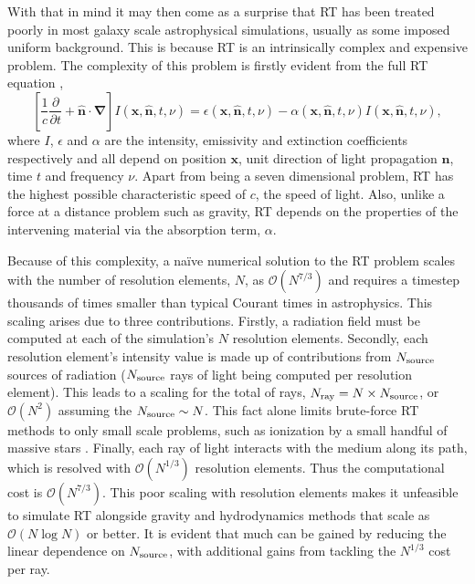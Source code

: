 \documentclass[fleq,usenatbib]{mnras}
\newcommand{\bigO}[1]{\mathcal{O}\left(#1\right)}
\newcommand{\NS}{N_{\rm source}}
\newcommand{\NR}{N_{\rm ray}}
\begin{document}
With that in mind it may then come as a surprise that RT has been treated 
poorly in most galaxy scale astrophysical simulations, usually as some 
imposed uniform background. This is because RT is an intrinsically complex and 
expensive problem. The complexity of this problem is firstly evident from the 
full RT equation 
\citep[e.g.][]{mihalasMihalas84},
\begin{equation} \label{eqn:classicrt}
\left[ \frac{1}{c} \frac{\partial}{\partial t} + \mathbf{\hat{n} \cdot \nabla}
 \right] I\left(\mathbf{x}, \mathbf{\hat{n}}, t, \nu\right) = 
\epsilon\left(\mathbf{x}, \mathbf{\hat{n}}, t, \nu\right) - 
\alpha\left(\mathbf{x}, \mathbf{\hat{n}}, t, \nu\right) 
I\left(\mathbf{x}, \mathbf{\hat{n}}, t, \nu\right),
\end{equation} 
where $I$, $\epsilon$ and $\alpha$ are the intensity, emissivity and 
extinction coefficients respectively and all depend on position $\mathbf{x}$, 
unit direction of light propagation $\mathbf{\hat{n}}$, time $t$ and frequency 
$\nu$. Apart from being a seven dimensional problem, RT has the highest 
possible characteristic speed of $c$, the speed of light. Also, unlike a force 
at a distance problem such as gravity, RT depends on the properties of the 
intervening material via the absorption term, $\alpha$.

Because of this complexity, a na\"ive numerical solution to the RT problem 
scales with the number of resolution elements, $N$, as $\bigO{N^{7/3}}$ and 
requires a timestep thousands of times smaller than typical Courant times in 
astrophysics. This scaling arises due to three contributions. Firstly, a 
radiation field must be computed at each of the simulation's $N$ resolution 
elements. Secondly, each resolution element's intensity value is made up of 
contributions from $\NS$ sources of radiation ($\NS$ rays of light being 
computed per resolution element). This leads to a scaling for the total of 
rays, $\NR = N \times \NS$, or $\bigO{N^2}$ assuming the $\NS \sim N$. This 
fact alone limits brute-force RT methods to only small scale problems, such as 
ionization by a small handful of massive stars \citep{howard16, howard17}. 
Finally, each ray of light interacts with the medium along its path, which is 
resolved with $\bigO{N^{1/3}}$ resolution elements. Thus the computational 
cost is $\bigO{N^{7/3}}$. This poor scaling with resolution elements makes it 
unfeasible to simulate RT alongside gravity and hydrodynamics methods that 
scale as $\bigO{N\log N}$ or better. It is evident that much can be gained by 
reducing the linear dependence on $\NS$, with additional gains from tackling 
the $N^{1/3}$ cost per ray.
\end{document}
